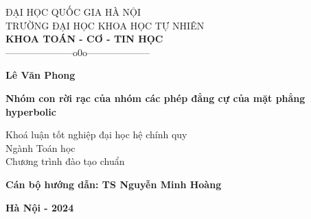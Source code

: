 	\begin{titlepage}
		\vspace*{-0.5cm}
		\begin{center}
			{\fontsize{13pt}{1}\selectfont  ĐẠI HỌC QUỐC GIA HÀ NỘI} \\
			{\fontsize{13pt}{1}\selectfont  TRƯỜNG ĐẠI HỌC KHOA HỌC TỰ NHIÊN} \\
			{\fontsize{13pt}{1}\selectfont  \bf KHOA TOÁN - CƠ - TIN HỌC}\\
			{---------------------o0o--------------------}
		\end{center}
		\vspace*{2.5cm}
		\begin{center}
			{\bf\fontsize{14pt}{1}\selectfont Lê Văn Phong}
		\end{center}
		\vspace*{2.5cm}
		\begin{center}
			{\bf\fontsize{18pt}{1}\selectfont Nhóm con rời rạc của nhóm các phép đẳng cự của mặt phẳng hyperbolic}
		\end{center}
		\vspace*{0.5cm}
		\begin{center}
            {\fontsize{14pt}{1}\selectfont Khoá luận tốt nghiệp đại học hệ chính quy}\\
			{\fontsize{14pt}{1}\selectfont Ngành Toán học}\\
		{\fontsize{14pt}{1}\selectfont Chương trình đào tạo chuẩn}\\
		\end{center}
		\vspace*{0.5cm}
		\begin{center}
			{\bf\fontsize{14pt}{1}\selectfont Cán bộ hướng dẫn: TS Nguyễn Minh Hoàng }
		\end{center}
		\vfill
		\begin{center}
			{\bf\fontsize{14pt}{1}\selectfont Hà Nội - 2024}
		\end{center}
	\end{titlepage}
